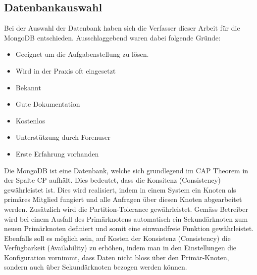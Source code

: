 \subsection{Datenbankauswahl}
Bei der Auswahl der Datenbank haben sich die Verfasser dieser Arbeit für die MongoDB entschieden. Ausschlaggebend waren dabei folgende Gründe:
\begin{itemize}
  \item Geeignet um die Aufgabenstellung zu lösen.
  \item Wird in der Praxis oft eingesetzt
  \item Bekannt
  \item Gute Dokumentation
  \item Kostenlos
  \item Unterstützung durch Forenuser
  \item Erste Erfahrung vorhanden
\end{itemize}
\noindent
Die MongoDB ist eine Datenbank, welche sich grundlegend im CAP Theorem in der Spalte CP aufhält. Dies bedeutet, dass die Konsitenz (Consistency) gewährleistet ist. Dies wird realisiert, indem in einem System ein Knoten als primäres Mitglied fungiert und alle Anfragen über diesen Knoten abgearbeitet werden. Zusätzlich wird die Partition-Tolerance gewährleistet. 
Gemäss Betreiber wird bei einem Ausfall des Primärknotens automatisch ein Sekundärknoten zum neuen Primärknoten definiert und somit eine einwandfreie Funktion gewährleistet. Ebenfalls soll es möglich sein, auf Kosten der Konsistenz (Consistency) die Verfügbarkeit (Availability) zu erhöhen, indem man in den Einstellungen die Konfiguration vornimmt, dass Daten nicht bloss über den Primär-Knoten, sondern auch über Sekundärknoten bezogen werden können.



